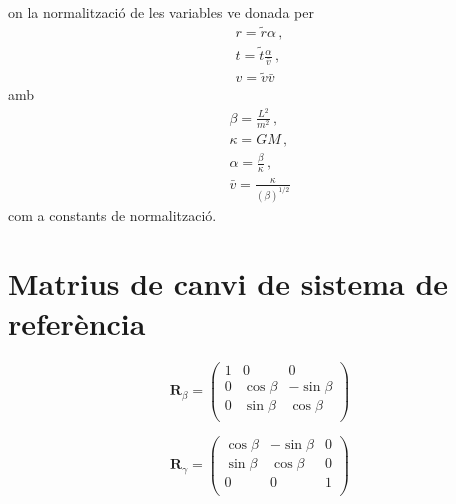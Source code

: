 \documentclass[11pt]{article}
\begin{document}
on la normalització de les variables ve donada per
\begin{align}
    r=\tilde{r}\alpha \, , \\
    t=\tilde{t}\frac{\alpha}{\bar{v}} \, , \\
    v=\tilde{v}\bar{v}
\end{align}
amb
\begin{align}
    \beta=\frac{L^2}{m^2} \, , \\
    \kappa=GM \, , \\
    \alpha = \frac{\beta}{\kappa} \, , \\
    \bar{v}=\frac{\kappa}{(\beta)^{1/2}}
\end{align}
com a constants de normalització.


\section{Matrius de canvi de sistema de referència}\label{annex: matr_rot}
\begin{equation}
    \mathbf{R}_{\beta}=
    \begin{pmatrix}
      1 & 0 & 0   \\
      0 & \cos\beta& -\sin\beta \\
      0 & \sin\beta & \cos\beta \\
    \end{pmatrix}
\end{equation}  

\begin{equation}
    \mathbf{R}_{\gamma}=
    \begin{pmatrix}
       \cos\beta& -\sin\beta& 0 \\
       \sin\beta & \cos\beta &0\\
      0 & 0 & 1  \\
    \end{pmatrix}
\end{equation}  
\end{document}
